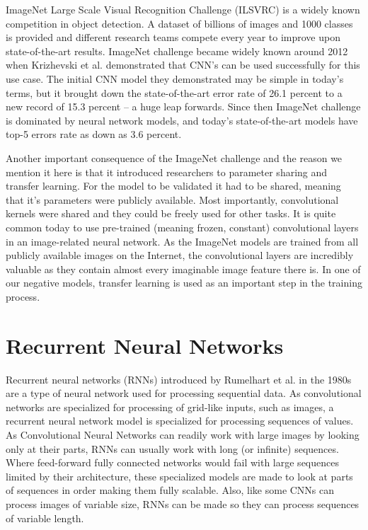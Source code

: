 \documentclass[b5paper]{book}
\let\cite\parencite
\begin{document}
ImageNet Large Scale Visual Recognition Challenge (ILSVRC) \cite{deng2009imagenet} is a widely known competition in object detection. A dataset of billions of images and 1000 classes is provided and different research teams compete every year to improve upon state-of-the-art results. ImageNet challenge became widely known around 2012 when Krizhevski et al. \cite{krizhevsky2012imagenet} demonstrated that CNN's can be used successfully for this use case. The initial CNN model they demonstrated may be simple in today's terms, but it brought down the state-of-the-art error rate of 26.1 percent to a new record of 15.3 percent -- a huge leap forwards. Since then ImageNet challenge is dominated by neural network models, and today's state-of-the-art models have top-5 errors rate as down as 3.6 percent.

Another important consequence of the ImageNet challenge and the reason we mention it here is that it introduced researchers to parameter sharing and transfer learning. For the model to be validated it had to be shared, meaning that it's parameters were publicly available. Most importantly, convolutional kernels were shared and they could be freely used for other tasks. It is quite common today to use pre-trained (meaning frozen, constant) convolutional layers in an image-related neural network. As the ImageNet models are trained from all publicly available images on the Internet, the convolutional layers are incredibly valuable as they contain almost every imaginable image feature there is. In one of our negative models, transfer learning is used as an important step in the training process. 

\section{Recurrent Neural Networks}

Recurrent neural networks (RNNs) introduced by Rumelhart et al. in the 1980s are a type of neural network used for processing sequential data. \cite{chollet2018deep} As convolutional networks are specialized for processing of grid-like inputs, such as images, a recurrent neural network model is specialized for processing sequences of values. As Convolutional Neural Networks can readily work with large images by looking only at their parts, RNNs can usually work with long (or infinite) sequences. Where feed-forward fully connected networks would fail with large sequences limited by their architecture, these specialized models are made to look at parts of sequences in order making them fully scalable. Also, like some CNNs can process images of variable size, RNNs can be made so they can process sequences of variable length.
\end{document}
